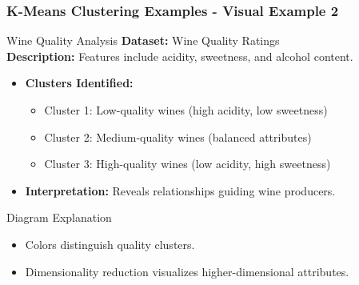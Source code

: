 \documentclass[aspectratio=169]{beamer}
\begin{document}
\begin{frame}[fragile]
    \frametitle{K-Means Clustering Examples - Visual Example 2}
    \begin{block}{Wine Quality Analysis}
        \textbf{Dataset:} Wine Quality Ratings\\
        \textbf{Description:} Features include acidity, sweetness, and alcohol content.
        
        \begin{itemize}
            \item \textbf{Clusters Identified:}
            \begin{itemize}
                \item Cluster 1: Low-quality wines (high acidity, low sweetness)
                \item Cluster 2: Medium-quality wines (balanced attributes)
                \item Cluster 3: High-quality wines (low acidity, high sweetness)
            \end{itemize}
            \item \textbf{Interpretation:} Reveals relationships guiding wine producers.
        \end{itemize}
    \end{block}
    
    \begin{block}{Diagram Explanation}
        \begin{itemize}
            \item Colors distinguish quality clusters.
            \item Dimensionality reduction visualizes higher-dimensional attributes.
        \end{itemize}
    \end{block}
\end{frame}
\end{document}
